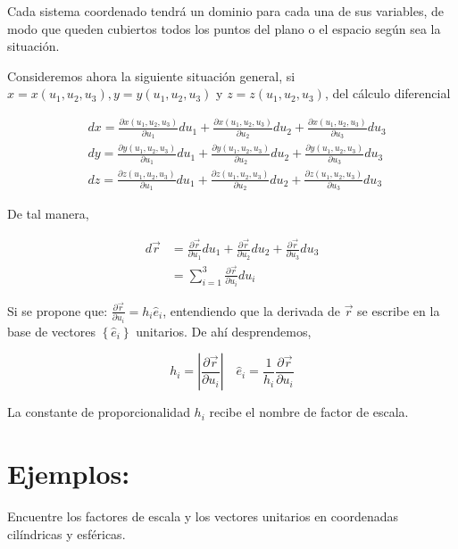 Cada sistema coordenado tendrá un dominio para cada una de sus variables, de modo que queden cubiertos todos los puntos del plano o el espacio según sea la situación.

Consideremos ahora la siguiente situación general, si $x=x\left(u_{1}, u_{2}, u_{3}\right), y=y\left(u_{1}, u_{2}, u_{3}\right)$ y $z=z\left(u_{1}, u_{2}, u_{3}\right)$, del cálculo diferencial

$$
\begin{aligned}
& d x=\frac{\partial x\left(u_{1}, u_{2}, u_{3}\right)}{\partial u_{1}} d u_{1}+\frac{\partial x\left(u_{1}, u_{2}, u_{3}\right)}{\partial u_{2}} d u_{2}+\frac{\partial x\left(u_{1}, u_{2}, u_{3}\right)}{\partial u_{3}} d u_{3} \\
& d y=\frac{\partial y\left(u_{1}, u_{2}, u_{3}\right)}{\partial u_{1}} d u_{1}+\frac{\partial y\left(u_{1}, u_{2}, u_{3}\right)}{\partial u_{2}} d u_{2}+\frac{\partial y\left(u_{1}, u_{2}, u_{3}\right)}{\partial u_{3}} d u_{3} \\
& d z=\frac{\partial z\left(u_{1}, u_{2}, u_{3}\right)}{\partial u_{1}} d u_{1}+\frac{\partial z\left(u_{1}, u_{2}, u_{3}\right)}{\partial u_{2}} d u_{2}+\frac{\partial z\left(u_{1}, u_{2}, u_{3}\right)}{\partial u_{3}} d u_{3}
\end{aligned}
$$

De tal manera,

$$
\begin{aligned}
d \vec{r} & =\frac{\partial \vec{r}}{\partial u_{1}} d u_{1}+\frac{\partial \vec{r}}{\partial u_{2}} d u_{2}+\frac{\partial \vec{r}}{\partial u_{3}} d u_{3} \\
& =\sum_{i=1}^{3} \frac{\partial \vec{r}}{\partial u_{i}} d u_{i}
\end{aligned}
$$

Si se propone que: $\frac{\partial \vec{r}}{\partial u_{i}}=h_{i} \hat{e}_{i}$, entendiendo que la derivada de $\vec{r}$ se escribe en la base de vectores $\left\{\widehat{e}_{i}\right\}$ unitarios. De ahí desprendemos,

$$
h_{i}=\left|\frac{\partial \vec{r}}{\partial u_{i}}\right| \quad \hat{e}_{i}=\frac{1}{h_{i}} \frac{\partial \vec{r}}{\partial u_{i}}
$$

La constante de proporcionalidad $h_{i}$ recibe el nombre de factor de escala.

\section{Ejemplos:}
Encuentre los factores de escala y los vectores unitarios en coordenadas cilíndricas y esféricas.

